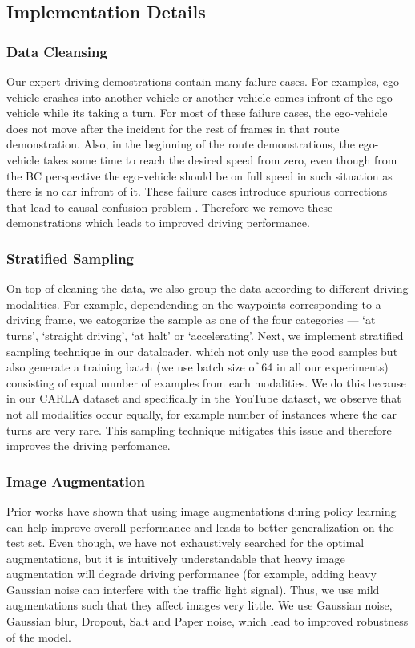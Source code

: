 \documentclass[letterpaper, 12pt]{book}
\theoremstyle{definition}
\theoremstyle{definition}
\theoremstyle{definition}
\theoremstyle{definition}
\theoremstyle{definition}
\begin{document}
\subsection{Implementation Details}
\label{sec:org201f9a4}
\subsubsection{Data Cleansing}
\label{sec:orge664fe6}
Our expert driving demostrations contain many failure cases. For examples,
ego-vehicle crashes into another vehicle or another vehicle comes infront of the
ego-vehicle while its taking a turn. For most of these failure cases, the
ego-vehicle does not move after the incident for the rest of frames in that
route demonstration. Also, in the beginning of the route demonstrations, the
ego-vehicle takes some time to reach the desired speed from zero, even though
from the BC perspective the ego-vehicle should be on full speed in such
situation as there is no car infront of it. These failure cases introduce
spurious corrections that lead to causal confusion problem
\cite{Codevilla2019}. Therefore we remove these demonstrations which leads to
improved driving performance.

\subsubsection{Stratified Sampling}
\label{sec:orgdd1802e}
On top of cleaning the data, we also group the data according to different
driving modalities. For example, dependending on the waypoints corresponding to
a driving frame, we catogorize the sample as one of the four categories --- `at
turns', `straight driving', `at halt' or `accelerating'. Next, we implement
stratified sampling technique in our dataloader, which not only use the good
samples but also generate a training batch (we use batch size of 64 in all our
experiments) consisting of equal number of examples from each modalities. We do
this because in our CARLA dataset and specifically in the YouTube dataset, we
observe that not all modalities occur equally, for example number of instances
where the car turns are very rare. This sampling technique mitigates this issue
and therefore improves the driving perfomance.

\subsubsection{Image Augmentation}
\label{sec:org0284d03}
Prior works \cite{Laskin2020,Kostrikov2020,Yarats2021,Mezghani2021} have shown
that using image augmentations during policy learning can help improve overall
performance and leads to better generalization on the test set. Even though, we
have not exhaustively searched for the optimal augmentations, but it is
intuitively understandable that heavy image augmentation will degrade driving
performance (for example, adding heavy Gaussian noise can interfere with the
traffic light signal). Thus, we use mild augmentations such that they affect
images very little. We use Gaussian noise, Gaussian blur, Dropout, Salt and
Paper noise, which lead to improved robustness of the model.
\end{document}
